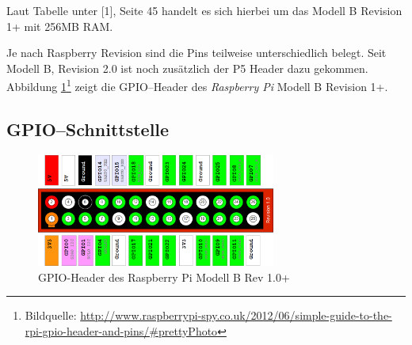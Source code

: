 \documentclass[11pt,ngerman,toc=listof,index=totoc]{scrreprt}
\newenvironment{Shaded}{}{}
\newcommand{\KeywordTok}[1]{\textcolor[rgb]{0.00,0.44,0.13}{\textbf{{#1}}}}
\newcommand{\NormalTok}[1]{{#1}}
\begin{document}
\begin{Shaded}
\end{Shaded}

Laut Tabelle unter {[}1{]}, Seite 45 handelt es sich hierbei um das
Modell B Revision 1+ mit 256MB RAM.

Je nach Raspberry Revision sind die Pins teilweise unterschiedlich
belegt. Seit Modell B, Revision 2.0 ist noch zusätzlich der P5 Header
dazu gekommen. Abbildung \ref{gpio}\footnote{Bildquelle:
  \url{http://www.raspberrypi-spy.co.uk/2012/06/simple-guide-to-the-rpi-gpio-header-and-pins/\#prettyPhoto}}
zeigt die GPIO--Header des \emph{Raspberry Pi} Modell B Revision 1+.

\subsection{GPIO--Schnittstelle}\label{gpioschnittstelle}

\begin{figure}[h!]
  \centering
  \includegraphics[width=0.7\textwidth]{images/gpio.png}
  \caption{GPIO-Header des Raspberry Pi Modell B Rev 1.0+}
  \label{gpio}
\end{figure}
\end{document}
